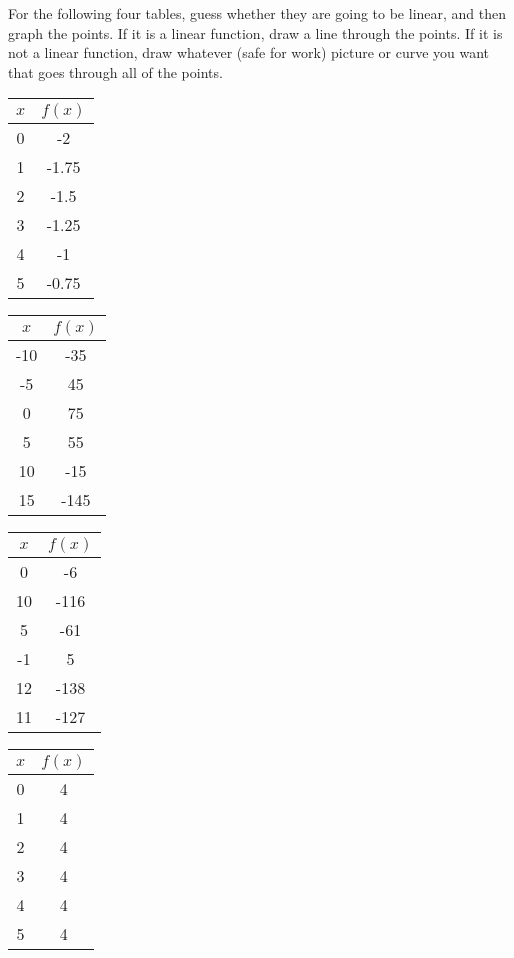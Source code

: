 \begin{exercise}
For the following four tables, guess whether they are going to be linear, and then graph the points.  If it is a linear function, draw a line through the points.  If it is not a linear function, draw whatever (safe for work) picture or curve you want that goes through all of the points.

	\begin{multicols}{4}
		\begin{tabular}{|c|c|}
		\hline
		$x$ & $f(x)$ \\
		\hline
		0	&	-2\\
		\hline
		1	&	-1.75\\
		\hline
		2	&	-1.5\\
		\hline
		3	&	-1.25\\
		\hline
		4	&	-1\\
		\hline
		5	&	-0.75\\
		\hline
		\end{tabular}
		
		\begin{tabular}{|c|c|}
		\hline
		$x$ & $f(x)$ \\
		\hline
		-10	&	-35\\
		\hline
		-5	&	45\\
		\hline
		0	&	75\\
		\hline
		5	&	55\\
		\hline
		10	&	-15\\
		\hline
		15	&	-145\\
		\hline
		\end{tabular}
		
		\begin{tabular}{|c|c|}
		\hline
		$x$ & $f(x)$ \\  %
		\hline
		0	&	-6\\
		\hline
		10	&	-116\\
		\hline
		5	&	-61\\
		\hline
		-1	&	5\\
		\hline
		12	&	-138\\
		\hline
		11	&	-127\\
		\hline
		\end{tabular}
		
		\begin{tabular}{|c|c|}
		\hline
		$x$ & $f(x)$ \\
		\hline
		0	&	4\\
		\hline
		1	&	4\\
		\hline
		2	&	4\\
		\hline
		3	&	4\\
		\hline
		4	&	4\\
		\hline
		5	&	4\\
		\hline
		\end{tabular}
	\end{multicols}
\end{exercise}
\bigskip

